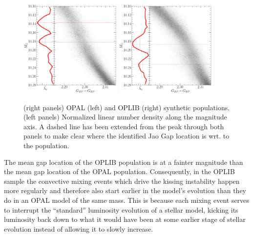 \begin{figure}
	\centering
	\includegraphics[width=0.45\textwidth]{OPAL_Jao_locator.pdf}
	\includegraphics[width=0.45\textwidth]{OPLIB_Jao_locator.pdf}
	\caption{(right panels) OPAL (left) and OPLIB (right) synthetic
	populations. (left panels) Normalized linear number density along the
	magnitude axis. A dashed line has been extended from the peak through both
	panels to make clear where the identified Jao Gap location is wrt. to the
	population. }
	\label{fig:JaoGapLocator}
\end{figure}

The mean gap location of the OPLIB population is at a fainter magnitude than
the mean gap location of the OPAL population. Consequently, in the OPLIB sample
the convective mixing events which drive the kissing instability happen more
regularly and therefore also start earlier in the model's evolution than they
do in an OPAL model of the same mass. This is because each mixing event serves
to interrupt the ``standard'' luminosity evolution of a stellar model, kicking
its luminosity back down to what it would have been at some earlier stage of
stellar evolution instead of allowing it to slowly increase.

